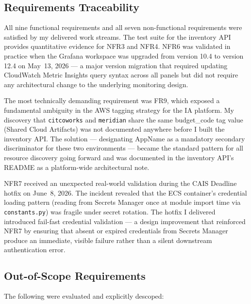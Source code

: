 \subsection{Requirements Traceability}

All nine functional requirements and all seven non-functional
requirements were satisfied by my delivered work streams. The
test suite for the inventory API provides quantitative evidence for NFR3
and NFR4. NFR6 was validated in practice when the Grafana workspace
was upgraded from version 10.4 to version 12.4 on May~13, 2026 ---
a major version migration that required updating CloudWatch Metric
Insights query syntax across all panels but did not require any
architectural change to the underlying monitoring design.

The most technically demanding requirement was FR9, which exposed a
fundamental ambiguity in the AWS tagging strategy for the IA platform.
My discovery that \texttt{citcoworks} and \texttt{meridian} share the
same budget\_code tag value (Shared Cloud Artifacts)
was not documented anywhere before I built the inventory API. The
solution --- designating AppName as a mandatory secondary
discriminator for these two environments --- became the standard pattern
for all resource discovery going forward and was documented in the
inventory API's README as a platform-wide architectural note.

NFR7 received an unexpected real-world validation during the
CAIS Deadline hotfix on June~8, 2026. The incident revealed
that the ECS container's credential loading pattern (reading from
Secrets Manager once at module import time via \texttt{constants.py})
was fragile under secret rotation. The hotfix I delivered introduced fail-fast
credential validation --- a design improvement that reinforced NFR7
by ensuring that absent or expired credentials from Secrets Manager
produce an immediate, visible failure rather than a silent downstream
authentication error.

\subsection{Out-of-Scope Requirements}

The following were evaluated and explicitly descoped:

